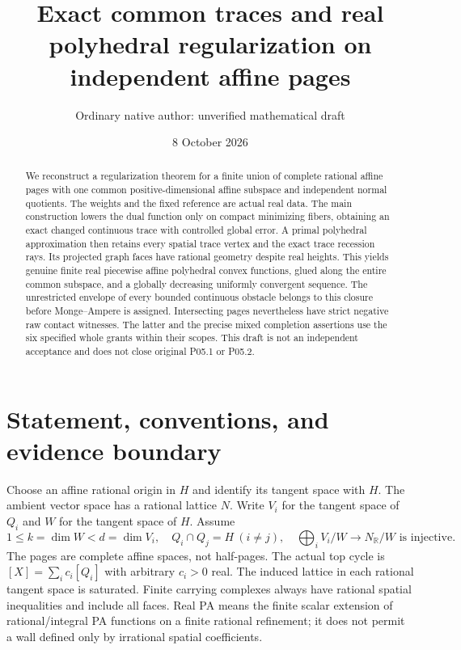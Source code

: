 \documentclass[11pt]{article}
\title{Exact common traces and real polyhedral regularization on independent affine pages}
\author{Ordinary native author: unverified mathematical draft}
\date{8 October 2026}
\theoremstyle{definition}\newtheorem{definition}[theorem]{Definition}
\theoremstyle{remark}\newtheorem{remark}[theorem]{Remark}
\newcommand{\R}{\mathbb R}\newcommand{\Q}{\mathbb Q}
\begin{document}
\maketitle
\begin{abstract}
We reconstruct a regularization theorem for a finite union of complete rational affine pages with one common positive-dimensional affine subspace and independent normal quotients. The weights and the fixed reference are actual real data. The main construction lowers the dual function only on compact minimizing fibers, obtaining an exact changed continuous trace with controlled global error. A primal polyhedral approximation then retains every spatial trace vertex and the exact trace recession rays. Its projected graph faces have rational geometry despite real heights. This yields genuine finite real piecewise affine polyhedral convex functions, glued along the entire common subspace, and a globally decreasing uniformly convergent sequence. The unrestricted envelope of every bounded continuous obstacle belongs to this closure before Monge--Ampere is assigned. Intersecting pages nevertheless have strict negative raw contact witnesses. The latter and the precise mixed completion assertions use the six specified whole grants within their scopes. This draft is not an independent acceptance and does not close original P05.1 or P05.2.
\end{abstract}
\tableofcontents

\section{Statement, conventions, and evidence boundary}
Choose an affine rational origin in $H$ and identify its tangent space with $H$. The ambient vector space has a rational lattice $N$. Write $V_i$ for the tangent space of $Q_i$ and $W$ for the tangent space of $H$. Assume
\begin{equation}\label{sector}
1\leq k=\dim W<d=\dim V_i,\quad Q_i\cap Q_j=H\ (i\ne j),\quad
\bigoplus_i V_i/W\longrightarrow N_{\R}/W\text{ is injective}.
\end{equation}
The pages are complete affine spaces, not half-pages. The actual top cycle is
$[X]=\sum_i c_i[Q_i]$ with arbitrary $c_i>0$ real. The induced lattice in each rational tangent space is saturated. Finite carrying complexes always have rational spatial inequalities and include all faces. Real PA means the finite scalar extension of rational/integral PA functions on a finite rational refinement; it does not permit a wall defined only by irrational spatial coefficients.
\end{document}
